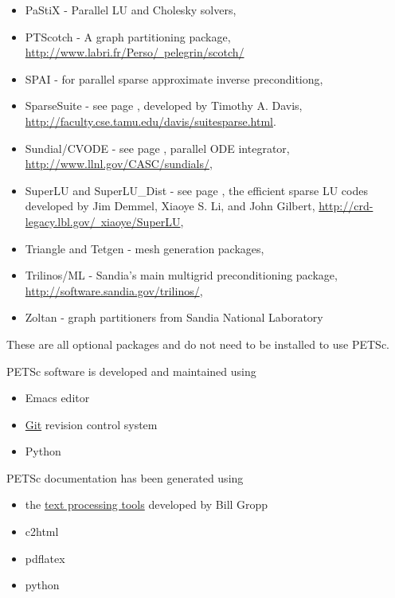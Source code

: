 \begin{itemize}
  \item PaStiX -     Parallel LU and Cholesky solvers,
  \item PTScotch -    A graph partitioning package, \href{http://www.labri.fr/Perso/~pelegrin/scotch/}{http://www.labri.fr/Perso/~pelegrin/scotch/}
  \item SPAI -        for parallel sparse approximate inverse preconditiong,
  \item SparseSuite - see page \pageref{sec_externalsol},  developed by Timothy A. Davis,
                    \href{http://faculty.cse.tamu.edu/davis/suitesparse.html}{http://faculty.cse.tamu.edu/davis/suitesparse.html}.
  \item Sundial/CVODE - see page \pageref{sec_sundials}, parallel ODE integrator,
                     \href{http://www.llnl.gov/CASC/sundials/}{http://www.llnl.gov/CASC/sundials/},
  \item SuperLU and SuperLU\_Dist - see page \pageref{sec_externalsol},
                    the efficient sparse LU codes developed by Jim Demmel,  Xiaoye S. Li, and John Gilbert,
                    \href{http://crd-legacy.lbl.gov/~xiaoye/SuperLU}{http://crd-legacy.lbl.gov/~xiaoye/SuperLU},
  \item Triangle and Tetgen - mesh generation packages,
  \item Trilinos/ML - Sandia's main multigrid preconditioning package, \href{http://software.sandia.gov/trilinos/}{http://software.sandia.gov/trilinos/},
  \item Zoltan - graph partitioners from Sandia National Laboratory
\end{itemize}
These are all optional packages and do not need to be installed to use PETSc.

PETSc software is developed and maintained using
\begin{itemize}
\item Emacs editor
\item \href{http://git-scm.com/}{Git} revision control system
\item Python
\end{itemize}

PETSc documentation has been generated using
\begin{itemize}
\item the \href{http://www.cs.uiuc.edu/~wgropp/projects/software/sowing/index.htm}{text processing tools} developed by Bill Gropp
\item c2html
\item pdflatex
\item python
\end{itemize}

